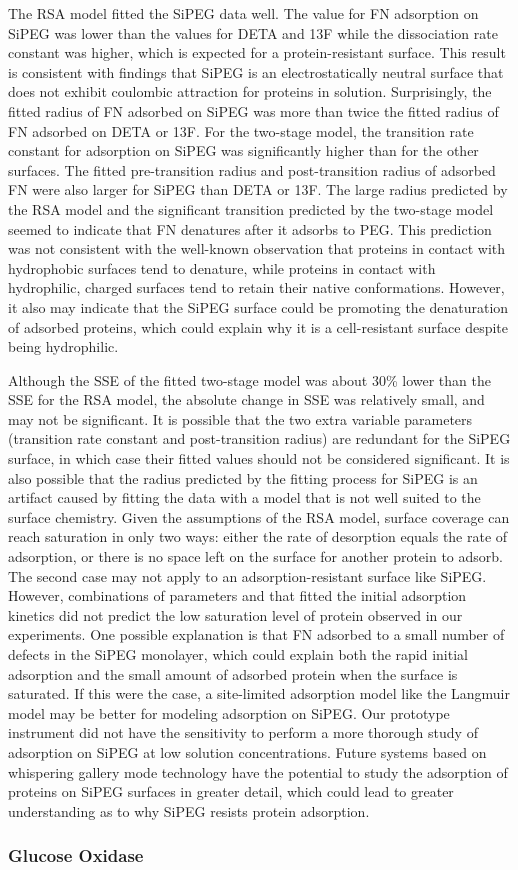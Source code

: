 The RSA model fitted the SiPEG data well. The value for FN adsorption
on SiPEG was lower than the values for DETA and 13F while the dissociation
rate constant was higher, which is expected for a protein-resistant
surface. This result is consistent with findings that SiPEG is an
electrostatically neutral surface that does not exhibit coulombic
attraction for proteins in solution. Surprisingly, the fitted radius
of FN adsorbed on SiPEG was more than twice the fitted radius of FN
adsorbed on DETA or 13F. For the two-stage model, the transition rate
constant for adsorption on SiPEG was significantly higher than for
the other surfaces. The fitted pre-transition radius and post-transition
radius of adsorbed FN were also larger for SiPEG than DETA or 13F.
The large radius predicted by the RSA model and the significant transition
predicted by the two-stage model seemed to indicate that FN denatures
after it adsorbs to PEG. This prediction was not consistent with the
well-known observation that proteins in contact with hydrophobic surfaces
tend to denature, while proteins in contact with hydrophilic, charged
surfaces tend to retain their native conformations. However, it also
may indicate that the SiPEG surface could be promoting the denaturation
of adsorbed proteins, which could explain why it is a cell-resistant
surface despite being hydrophilic. 

Although the SSE of the fitted two-stage model was about 30\% lower
than the SSE for the RSA model, the absolute change in SSE was relatively
small, and may not be significant. It is possible that the two extra
variable parameters (transition rate constant and post-transition
radius) are redundant for the SiPEG surface, in which case their fitted
values should not be considered significant. It is also possible that
the radius predicted by the fitting process for SiPEG is an artifact
caused by fitting the data with a model that is not well suited to
the surface chemistry. Given the assumptions of the RSA model, surface
coverage can reach saturation in only two ways: either the rate of
desorption equals the rate of adsorption, or there is no space left
on the surface for another protein to adsorb. The second case may
not apply to an adsorption-resistant surface like SiPEG. However,
combinations of parameters and that fitted the initial adsorption
kinetics did not predict the low saturation level of protein observed
in our experiments. One possible explanation is that FN adsorbed to
a small number of defects in the SiPEG monolayer, which could explain
both the rapid initial adsorption and the small amount of adsorbed
protein when the surface is saturated. If this were the case, a site-limited
adsorption model like the Langmuir model may be better for modeling
adsorption on SiPEG. Our prototype instrument did not have the sensitivity
to perform a more thorough study of adsorption on SiPEG at low solution
concentrations. Future systems based on whispering gallery mode technology
have the potential to study the adsorption of proteins on SiPEG surfaces
in greater detail, which could lead to greater understanding as to
why SiPEG resists protein adsorption. 


\subsubsection{Glucose Oxidase}
